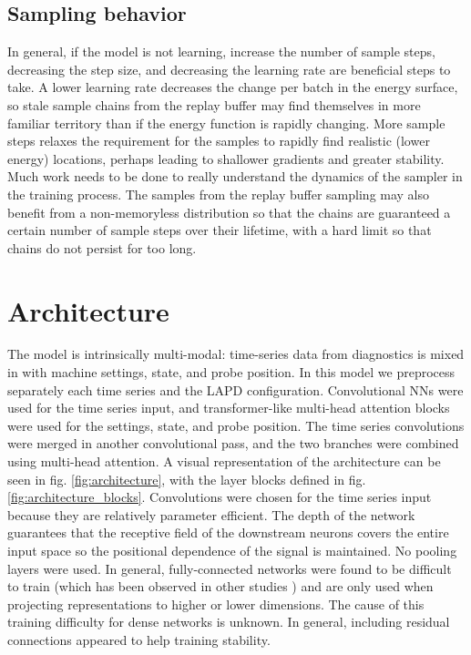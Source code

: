\subsection{Sampling behavior}
In general, if the model is not learning, increase the number of sample steps, decreasing the step size, and decreasing the learning rate are beneficial steps to take. A lower learning rate decreases the change per batch in the energy surface, so stale sample chains from the replay buffer may find themselves in more familiar territory than if the energy function is rapidly changing. More sample steps relaxes the requirement for the samples to rapidly find realistic (lower energy) locations, perhaps leading to shallower gradients and greater stability. Much work needs to be done to really understand the dynamics of the sampler in the training process. The samples from the replay buffer sampling may also benefit from a non-memoryless distribution so that the chains are guaranteed a certain number of sample steps over their lifetime, with a hard limit so that chains do not persist for too long. 

\section{Architecture}

The model is intrinsically multi-modal: time-series data from diagnostics is mixed in with machine settings, state, and probe position. In this model we preprocess separately each time series and the LAPD configuration. Convolutional NNs were used for the time series input, and transformer-like multi-head attention blocks were used for the settings, state, and probe position. The time series convolutions were merged in another convolutional pass, and the two branches were combined using multi-head attention.  A visual representation of the architecture can be seen in fig. \ref{fig:architecture}, with the layer blocks defined in fig. \ref{fig:architecture_blocks}. Convolutions were chosen for the time series input because they are relatively parameter efficient.  The depth of the network guarantees that the receptive field of the downstream neurons covers the entire input space so the positional dependence of the signal is maintained. No pooling layers were used. In general, fully-connected networks were found to be difficult to train (which has been observed in other studies \cite{cheng_versatile_2024}) and are only used when projecting representations to higher or lower dimensions. The cause of this training difficulty for dense networks is unknown. In general, including residual connections appeared to help training stability.

